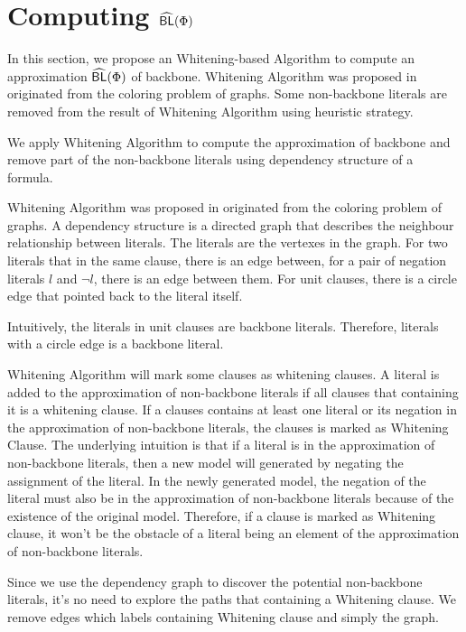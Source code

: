 

\section{Computing ${\sf \widehat{BL}}(\Phi)$}
In this section, we propose an Whitening-based Algorithm to compute an approximation ${\sf \widehat{BL}}(\Phi)$ of backbone.
Whitening Algorithm was proposed in \cite{CJG2001} originated from the coloring problem of graphs. Some non-backbone literals are removed from the result of Whitening Algorithm using heuristic strategy.


 We apply Whitening Algorithm to compute the approximation of backbone and remove part of the non-backbone literals using dependency structure of a formula.

 Whitening Algorithm was proposed in \cite{CJG2001} originated from the coloring problem of graphs. A dependency structure is a directed graph that describes the neighbour relationship between literals. The literals are the vertexes in the graph. For two literals that in the same clause, there is an edge between, for a pair of negation literals $l$ and $\neg l$, there is an edge between them. For unit clauses, there is a circle edge that pointed back to the literal itself.

 Intuitively, the literals in unit clauses are backbone literals. Therefore, literals with a circle edge is a backbone literal.

 Whitening Algorithm will mark some clauses as whitening clauses. A literal is added to the approximation of non-backbone literals if all clauses that containing it is a whitening clause. If a clauses contains at least one literal or its negation in the approximation of non-backbone literals, the clauses is marked as Whitening Clause. The underlying intuition is that if a literal is in the approximation of non-backbone literals, then a new model will generated by negating the assignment of the literal. In the newly generated model, the negation of the literal must also be in the approximation of non-backbone literals because of the existence of the original model. Therefore, if a clause is marked as Whitening clause, it won't be the obstacle of a literal being an element of the approximation of non-backbone literals.

 Since we use the dependency graph to discover the potential non-backbone literals, it's no need to explore the paths that containing a Whitening clause. We remove edges which labels containing Whitening clause and simply the graph.


